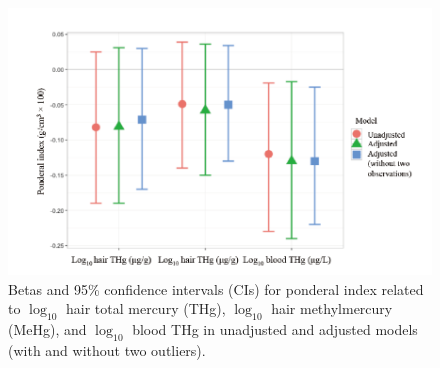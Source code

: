 \begin{figure}
  \centering
    \label{fig:Fig322}
  \includegraphics[scale=1]{Figures/Fig322.pdf}
  \caption[Betas and 95\% confidence intervals for ponderal index related to $\log_{10}$ hair total mercury, $\log_{10}$ hair methylmercury, and $\log_{10}$ blood total mercury in unadjusted and adjusted models (with and without two outliers)]{Betas and 95\% confidence intervals (CIs) for ponderal index related to $\log_{10}$ hair total mercury (THg), $\log_{10}$ hair methylmercury (MeHg), and $\log_{10}$ blood THg in unadjusted and adjusted models (with and without two outliers).}
\end{figure}


